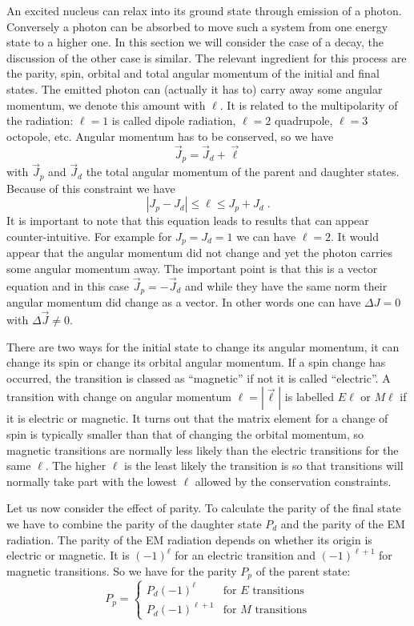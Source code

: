 \documentclass[12pt]{article}
\begin{document}
An excited nucleus can relax into its ground state through emission of a photon. Conversely a photon can be absorbed to move such a system from one energy state to a higher one. In this section we will consider the case of a decay, the discussion of the other case is similar. The relevant ingredient for this process are the parity, spin, orbital and total angular momentum of the initial and final states. The emitted photon can (actually it has to) carry away some angular momentum, we denote this amount with $\ell$. It is related to the multipolarity of the radiation: $\ell=1$ is called dipole radiation, $\ell=2$ quadrupole, $\ell=3$ octopole, etc. Angular momentum has to be conserved, so we have
\[\vec J_p=\vec J_d+\vec \ell\]
with $\vec J_p$ and $\vec J_d$ the total angular momentum of the parent and daughter states. Because of this constraint we have
\[|J_p-J_d|\leq \ell \leq J_p+J_d \;.\]
It is important to note that this equation leads to results that can appear counter-intuitive. For example for $J_p=J_d=1$ we can have $\ell=2$. It would appear that the angular momentum did not change and yet the photon carries some angular momentum away. The important point is that this is a vector equation and in this case $\vec J_p=-\vec J_d$ and while they have the same norm their angular momentum did change as a vector. In other words one can have $\Delta J=0$ with $\Delta \vec J\neq 0$. 

There are two ways for the initial state to change its angular momentum, it can change its spin or change its orbital angular momentum. If a spin change has occurred, the transition is classed as ``magnetic'' if not it is called ``electric''. A transition with change on angular momentum $\ell=|\vec{\ell}|$ is labelled $E\ell$ or $M\ell$ if it is electric or magnetic. It turns out that the matrix element for a change of spin is typically smaller than that of changing the orbital momentum, so magnetic transitions are normally less likely than the electric transitions for the same $\ell$. The higher $\ell$ is the least likely the transition is so that transitions will normally take part with the lowest $\ell$ allowed by the conservation constraints.

Let us now consider the effect of parity. To calculate the parity of the final state we have to combine the parity of the daughter state $P_d$ and the parity of the EM radiation. The parity of the EM radiation depends on whether its origin is electric or magnetic. It is $(-1)^\ell$ for an electric transition and $(-1)^{\ell+1}$ for magnetic transitions. So we have for the parity $P_p$ of the parent state:
\[P_p=\left\{\begin{array}{cc}
P_d(-1)^\ell&\mbox{for $E$ transitions}\\
P_d(-1)^{\ell+1}&\mbox{for $M$ transitions}
\end{array}\right.
\]
\end{document}
